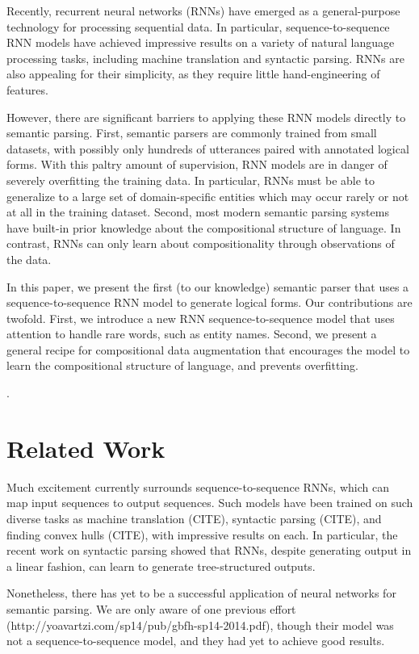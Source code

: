 \documentclass[11pt,letterpaper]{article}
\begin{document}
Recently, recurrent neural networks (RNNs) have emerged
as a general-purpose technology for processing sequential data.
In particular, sequence-to-sequence RNN models
have achieved impressive results on a variety of natural language processing
tasks, including machine translation and syntactic parsing.
RNNs are also appealing for their simplicity, as they require 
little hand-engineering of features.

However, there are significant barriers to applying these 
RNN models directly to semantic parsing.
First, semantic parsers are commonly trained from small datasets,
with possibly only hundreds of utterances paired with annotated logical forms.
With this paltry amount of supervision,
RNN models are in danger of severely overfitting the training data.
In particular, RNNs must be able to generalize to a large set of
domain-specific entities which may occur rarely or not at all
in the training dataset.
Second, most modern semantic parsing systems have built-in
prior knowledge about the compositional structure of language.
In contrast, RNNs can only learn about compositionality
through observations of the data.

In this paper, we present the first (to our knowledge)
semantic parser that uses a sequence-to-sequence RNN model to generate
logical forms.  
Our contributions are twofold.
First, we introduce a new RNN sequence-to-sequence model that uses 
attention to handle rare words, such as entity names.
Second, we present a general recipe
for compositional data augmentation that encourages 
the model to learn the compositional structure of language, 
and prevents overfitting.

\cite{liang2013lambdadcs}.

\section{Related Work}
Much excitement currently surrounds sequence-to-sequence RNNs,
which can map input sequences to output sequences.
Such models have been trained on such diverse tasks as
machine translation (CITE), syntactic parsing (CITE), and 
finding convex hulls (CITE), with impressive results on each.
In particular, the recent work on syntactic parsing showed that
RNNs, despite generating output in a linear fashion, can 
learn to generate tree-structured outputs.

Nonetheless, there has yet to be a successful application of
neural networks for semantic parsing.
We are only aware of one previous effort 
(http://yoavartzi.com/sp14/pub/gbfh-sp14-2014.pdf),
though their model was not a sequence-to-sequence model,
and they had yet to achieve good results.
\end{document}
